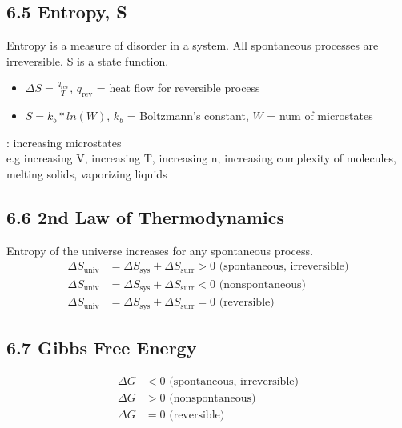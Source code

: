 \subsection{6.5 Entropy, S}
    Entropy is a measure of disorder in a system. All spontaneous processes are irreversible. S is a state function.
    \begin{itemize}
        \item $\Delta S = \frac{q_\text{rev}}{T}$, $q_\text{rev}$ = heat flow for reversible process
        \item $S = k_b*ln(W)$, $k_b$ = Boltzmann's constant, $W$ = num of microstates
    \end{itemize}
    : increasing microstates\\
    e.g increasing V, increasing T, increasing n, increasing complexity of molecules, melting solids, vaporizing liquids

\subsection{6.6 2nd Law of Thermodynamics}
    Entropy of the universe increases for any spontaneous process.
    \begin{align*}
        \Delta S_\text{univ} & = \Delta S_\text{sys} + \Delta S_\text{surr} > 0 \text{ (spontaneous, irreversible)}\\
        \Delta S_\text{univ} & = \Delta S_\text{sys} + \Delta S_\text{surr} < 0 \text{ (nonspontaneous)}\\
        \Delta S_\text{univ} & = \Delta S_\text{sys} + \Delta S_\text{surr} = 0 \text{ (reversible)}
    \end{align*}

\subsection{6.7 Gibbs Free Energy}
    \begin{align*}
        \Delta G & < 0 \text{ (spontaneous, irreversible)}\\
        \Delta G & > 0 \text{ (nonspontaneous)}\\
        \Delta G & = 0 \text{ (reversible)}
    \end{align*}